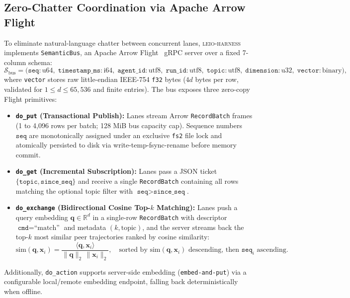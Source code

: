 \documentclass[11pt]{article}
\begin{document}
\subsection{Zero-Chatter Coordination via Apache Arrow Flight}
\label{sec:bus}

To eliminate natural-language chatter between concurrent lanes, \textsc{leio-harness} implements \texttt{SemanticBus}, an Apache Arrow Flight~\cite{arrowflight} gRPC server over a fixed 7-column schema:
\begin{equation}
\label{eq:arrow-schema}
\mathcal{S}_{\text{bus}} = \bigl(\texttt{seq}: \text{u64},\; \texttt{timestamp\_ms}: \text{i64},\; \texttt{agent\_id}: \text{utf8},\; \texttt{run\_id}: \text{utf8},\; \texttt{topic}: \text{utf8},\; \texttt{dimension}: \text{u32},\; \texttt{vector}: \text{binary}\bigr),
\end{equation}
where \texttt{vector} stores raw little-endian IEEE-754 \texttt{f32} bytes ($4d$ bytes per row, validated for $1 \le d \le 65{,}536$ and finite entries). The bus exposes three zero-copy Flight primitives:
\begin{itemize}
    \item \textbf{\texttt{do\_put} (Transactional Publish):} Lanes stream Arrow \texttt{RecordBatch} frames (1 to 4,096 rows per batch; 128 MiB bus capacity cap). Sequence numbers $\texttt{seq}$ are monotonically assigned under an exclusive \texttt{fs2} file lock and atomically persisted to disk via write-temp-fsync-rename before memory commit.
    \item \textbf{\texttt{do\_get} (Incremental Subscription):} Lanes pass a JSON ticket $\{\texttt{topic}, \texttt{since\_seq}\}$ and receive a single \texttt{RecordBatch} containing all rows matching the optional topic filter with $\texttt{seq} > \texttt{since\_seq}$.
    \item \textbf{\texttt{do\_exchange} (Bidirectional Cosine Top-$k$ Matching):} Lanes push a query embedding $\mathbf{q} \in \mathbb{R}^d$ in a single-row \texttt{RecordBatch} with descriptor $\texttt{cmd} = \text{``match''}$ and metadata $(k, \text{topic})$, and the server streams back the top-$k$ most similar peer trajectories ranked by cosine similarity:
    \begin{equation}
    \label{eq:cosine-match}
    \text{sim}(\mathbf{q}, \mathbf{x}_i) = \frac{\langle \mathbf{q}, \mathbf{x}_i \rangle}{\|\mathbf{q}\|_2 \, \|\mathbf{x}_i\|_2}, \quad \text{sorted by } \text{sim}(\mathbf{q}, \mathbf{x}_i) \text{ descending, then } \texttt{seq}_i \text{ ascending.}
    \end{equation}
\end{itemize}
Additionally, \texttt{do\_action} supports server-side embedding (\texttt{embed-and-put}) via a configurable local/remote embedding endpoint, falling back deterministically when offline.
\end{document}
